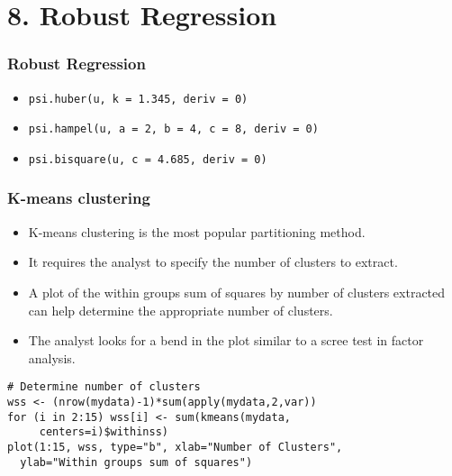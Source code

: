 \documentclass{beamer}
\begin{document}
\section*{8. Robust Regression}
\begin{frame}[fragile]
\frametitle{Robust Regression}
\Large

\begin{itemize}
\item \texttt{psi.huber(u, k = 1.345, deriv = 0)}
\item \texttt{psi.hampel(u, a = 2, b = 4, c = 8, deriv = 0)}
\item \texttt{psi.bisquare(u, c = 4.685, deriv = 0)}
\end{itemize}

\end{frame}

\begin{frame}
\frametitle{K-means clustering}
\Large

\begin{itemize}
\item K-means clustering is the most popular partitioning method. 
\item It requires the analyst to specify the number of clusters to extract. 
\item A plot of the within groups sum of squares by number of clusters extracted can help determine the appropriate number of clusters. 
\item The analyst looks for a bend in the plot similar to a scree test in factor analysis.
\end{itemize}
\end{frame}

\begin{frame}[fragile]
\begin{verbatim}
# Determine number of clusters
wss <- (nrow(mydata)-1)*sum(apply(mydata,2,var))
for (i in 2:15) wss[i] <- sum(kmeans(mydata, 
  	 centers=i)$withinss)
plot(1:15, wss, type="b", xlab="Number of Clusters",
  ylab="Within groups sum of squares")
\end{verbatim}


\end{frame}

\end{document}
